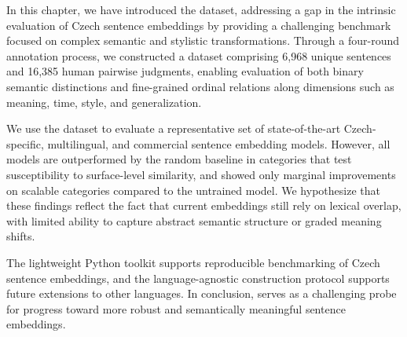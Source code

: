 In this chapter, we have introduced the \costra dataset, addressing a gap in the intrinsic evaluation of Czech sentence embeddings by providing a challenging benchmark focused on complex semantic and stylistic transformations. Through a four-round annotation process, we constructed a dataset comprising 6,968 unique sentences and 16,385 human pairwise judgments, enabling evaluation of both binary semantic distinctions and fine-grained ordinal relations along dimensions such as meaning, time, style, and generalization.

We use the \costra dataset to evaluate a representative set of state-of-the-art Czech-specific, multilingual, and commercial sentence embedding models. However, all models are outperformed by the random baseline in categories that test susceptibility to surface-level similarity, and showed only marginal improvements on scalable categories compared to the untrained \randombert model. We hypothesize that these findings reflect the fact that current embeddings still rely on lexical overlap, with limited ability to capture abstract semantic structure or graded meaning shifts.

The lightweight Python \costra toolkit supports reproducible benchmarking of Czech sentence embeddings, and the language-agnostic construction protocol supports future extensions to other languages. In conclusion, \costra serves as a challenging probe for progress toward more robust and semantically meaningful sentence embeddings.

